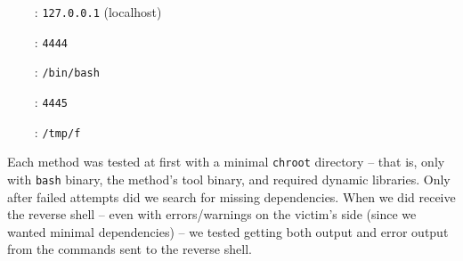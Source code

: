 \setlength{\leftmargini}{5em}
\begin{itemize}
\item[\host\ :] \texttt{127.0.0.1} (localhost)
\item[\port\ :] \texttt{4444}
\item[\shell\ :] \texttt{/bin/bash}
\item[\portt\ :] \texttt{4445}
\item[\tmp\ :] \texttt{/tmp/f}
\end{itemize}
\setlength{\leftmargini}{2.5em}

Each method was tested at first with a minimal \texttt{chroot} directory -- that is, only with \texttt{bash} binary, the method's tool binary, and required dynamic libraries. Only after failed attempts did we search for missing dependencies. When we did receive the reverse shell -- even with errors/warnings on the victim's side (since we wanted minimal dependencies) -- we tested getting both output and error output from the commands sent to the reverse shell.
